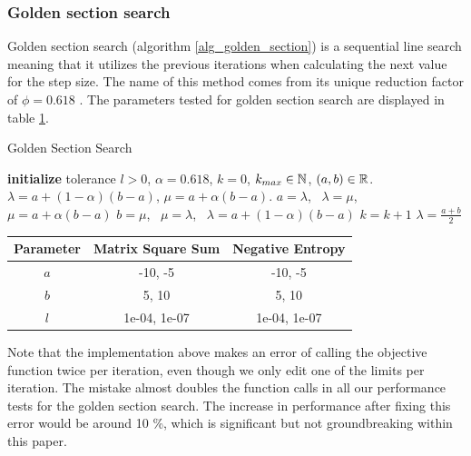 \documentclass[english, 12pt, a4paper, sci, utf8, a-1b, online, table]{aaltothesis}
\newcommand{\R}{\ensuremath\mathbb{R}}
\newcommand{\N}{\ensuremath\mathbb{N}}
\begin{document}
\subsubsection{Golden section search}
\label{sect:golden_section_search}

Golden section search (algorithm \ref{alg_golden_section}) is a sequential line search meaning that it utilizes the previous iterations when calculating the next value for the step size. The name of this method comes from its unique reduction factor of $\phi = 0.618$ \cite{book:nonlinear_programming}. The parameters tested for golden section search are displayed in table \ref{tab:params_GoldenSectionSearch}.

\begin{algorithm}[H]
\caption{Golden Section Search}
\label{alg_golden_section}
\begin{algorithmic}[1]
\STATE \textbf{initialize} tolerance $l > 0$, $\alpha = 0.618$, $k = 0$, $k_{max} \in \N$, $(a, b) \in \R$.
\STATE $\lambda = a + (1 - \alpha) (b - a)$, $\mu = a + \alpha (b - a)$.
    \IF{$\theta(\lambda) > \theta(\mu)$}
        \STATE $a = \lambda$, \ $\lambda = \mu$, \ $\mu = a + \alpha (b - a)$
    \ELSE
        \STATE $b = \mu$, \ $\mu = \lambda$, \ $\lambda = a + (1 - \alpha) (b - a)$
    \ENDIF
    \STATE $k = k + 1$
\ENDWHILE
\RETURN $\lambda = \frac{a + b}{2}$
\end{algorithmic}
\end{algorithm}

\begin{table}[H]
\label{tab:params_GoldenSectionSearch}
\centering
{}
\begin{tabular}{|c|c|c|}
\hline
\rowcolor{gray!25}
Parameter & Matrix Square Sum & Negative Entropy \\
\hline
$a$ & -10, -5 & -10, -5 \\
$b$ & 5, 10 & 5, 10 \\
$l$ & 1e-04, 1e-07 & 1e-04, 1e-07 \\
\hline
\end{tabular}
\end{table}


Note that the implementation above makes an error of calling the objective function twice per iteration, even though we only edit one of the limits per iteration. The mistake almost doubles the function calls in all our performance tests for the golden section search. The increase in performance after fixing this error would be around 10 \%, which is significant but not groundbreaking within this paper. 
\end{document}
